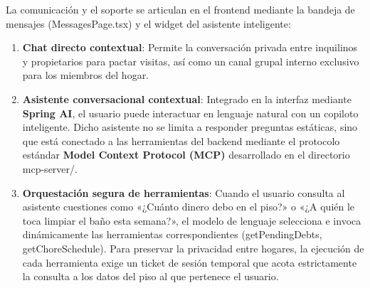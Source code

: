 La comunicación y el soporte se articulan en el frontend mediante la bandeja de mensajes (MessagesPage.tsx) y el widget del asistente inteligente:

\begin{enumerate}
    \item \textbf{Chat directo contextual}: Permite la conversación privada entre inquilinos y propietarios para pactar visitas, así como un canal grupal interno exclusivo para los miembros del hogar.
    \item \textbf{Asistente conversacional contextual}: Integrado en la interfaz mediante \textbf{Spring AI}, el usuario puede interactuar en lenguaje natural con un copiloto inteligente. Dicho asistente no se limita a responder preguntas estáticas, sino que está conectado a las herramientas del backend mediante el protocolo estándar \textbf{Model Context Protocol (MCP)} desarrollado en el directorio mcp-server/.
    \item \textbf{Orquestación segura de herramientas}: Cuando el usuario consulta al asistente cuestiones como «¿Cuánto dinero debo en el piso?» o «¿A quién le toca limpiar el baño esta semana?», el modelo de lenguaje selecciona e invoca dinámicamente las herramientas correspondientes (getPendingDebts, getChoreSchedule). Para preservar la privacidad entre hogares, la ejecución de cada herramienta exige un ticket de sesión temporal que acota estrictamente la consulta a los datos del piso al que pertenece el usuario.
\end{enumerate}

